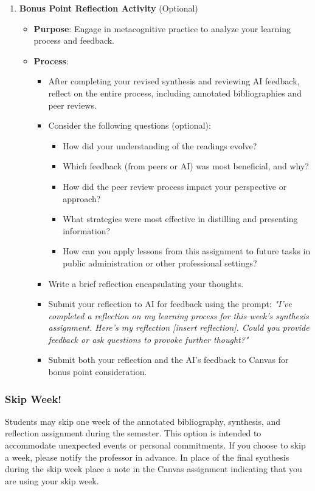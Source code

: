 \documentclass[12pt, letterpaper]{article}
\newenvironment{boldnumlist}
{\begin{enumerate}[label=\textbf{\arabic*.}]}
{\end{enumerate}}
\begin{document}
\begin{boldnumlist}
\item \textbf{Bonus Point Reflection Activity} (Optional)

\begin{itemize}
    \item \textbf{Purpose}: Engage in metacognitive practice to analyze your learning process and feedback.
    \item \textbf{Process}:
    \begin{itemize}
        \item After completing your revised synthesis and reviewing AI feedback, reflect on the entire process, including annotated bibliographies and peer reviews.
        \item Consider the following questions (optional):
        \begin{itemize}
            \item How did your understanding of the readings evolve?
            \item Which feedback (from peers or AI) was most beneficial, and why?
            \item How did the peer review process impact your perspective or approach?
            \item What strategies were most effective in distilling and presenting information?
            \item How can you apply lessons from this assignment to future tasks in public administration or other professional settings?
        \end{itemize}
        \item Write a brief reflection encapsulating your thoughts.
        \item Submit your reflection to AI for feedback using the prompt:
        \textit{"I've completed a reflection on my learning process for this week's synthesis assignment. Here's my reflection [insert reflection]. Could you provide feedback or ask questions to provoke further thought?"}
        \item Submit both your reflection and the AI's feedback to Canvas for bonus point consideration.
    \end{itemize}
\end{itemize}
\end{boldnumlist}
\subsubsection*{Skip Week!}

Students may skip one week of the annotated bibliography, synthesis, and reflection assignment during the semester. This option is intended to accommodate unexpected events or personal commitments. If you choose to skip a week, please notify the professor in advance. In place of the final synthesis during the skip week place a note in the Canvas assignment indicating that you are using your skip week.
\end{document}
